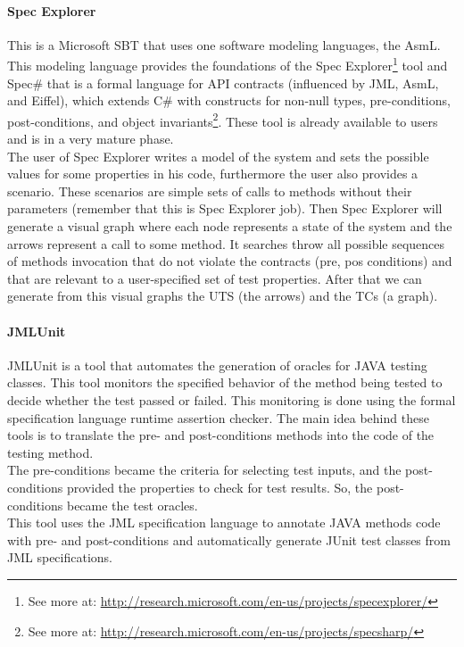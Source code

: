 \paragraph{Spec Explorer}
This is a Microsoft \ac{SBT} that uses one software modeling languages, the \ac{AsmL}.
This modeling language provides the foundations of the Spec Explorer\footnote{See more at: \url{http://research.microsoft.com/en-us/projects/specexplorer/}} tool
and Spec\# that is a formal language for \ac{API} contracts (influenced by \ac{JML}, \ac{AsmL}, and Eiffel), which extends C\# with constructs for non-null types,
pre-conditions, post-conditions, and object invariants\footnote{See more at: \url{http://research.microsoft.com/en-us/projects/specsharp/}}.
These tool is already available to users and is in a very mature phase.\\
\indent The user of Spec Explorer writes a model of the system and sets the possible values for some properties in his code, furthermore the user also provides a scenario.
These scenarios are simple sets of calls to methods without their parameters (remember that this is Spec Explorer job).
Then Spec Explorer will generate a visual graph where each node represents a state of the system and the arrows represent a call to some method.
It searches throw all possible sequences of methods invocation that do not violate the contracts (pre, pos conditions) and
that are relevant to a user-specified set of test properties. After that we can generate from this visual graphs the \ac{UTS} (the arrows) and the
\ac{TC}s (a graph).

\paragraph{JMLUnit}
JMLUnit\cite{Cheon04thejml} is a tool that automates the generation of oracles for JAVA testing classes. This tool
monitors the specified behavior of the method being tested to decide whether the test passed or failed.
This monitoring is done using the formal specification language runtime assertion checker.
The main idea behind these tools is to translate the pre- and post-conditions methods into the code of the testing method.\\
The pre-conditions became the criteria for selecting test inputs, and the post-conditions provided the properties to check for
test results. So, the post-conditions became the test oracles.\\
This tool uses the \ac{JML}\cite{Burdy03anoverview} specification language to annotate JAVA methods code with pre- and post-conditions and
automatically generate JUnit test classes from \ac{JML} specifications.

